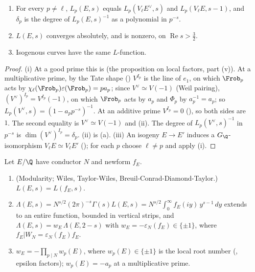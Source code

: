 \begin{proposition}\label{prop:lfunctions:LE}
\begin{enumerate}[label=(\roman*)]
\item For every $p\ne\ell$, $L_p(E,s)$ equals $L_p(V_\ell E^\vee,s)$ and $L_p(V_\ell E,s-1)$, and $\delta_p$ is the degree of $L_p(E,s)^{-1}$ as a polynomial in $p^{-s}$.
\item $L(E,s)$ converges absolutely, and is nonzero, on $\operatorname{Re}s>\frac32$.
\item Isogenous curves have the same $L$-function.
\end{enumerate}
\end{proposition}

\begin{proof}
(i) At a good prime this is  (the proposition on local factors, part (v)). At a multiplicative prime, by the Tate shape () $V^{I_p}$ is the
line of $e_1$, on which $\Frob_p$ acts by $\chi_\ell(\Frob_p)\varepsilon(\Frob_p)=pa_p$; since $V^\vee\simeq V(-1)$ (Weil pairing), $(V^\vee)^{I_p}=V^{I_p}(-1)$, on which $\Frob_p$ acts by $a_p$
and $\Phi_p$ by $a_p^{-1}=a_p$; so $L_p(V^\vee,s)=(1-a_pp^{-s})^{-1}$. At an additive prime $V^{I_p}=0$ (), so both sides are $1$. The second equality is
$V^\vee\simeq V(-1)$ and (ii). The degree of $L_p(V^\vee,s)^{-1}$ in $p^{-s}$ is $\dim(V^\vee)^{I_p}=\delta_p$. (ii) is
(a). (iii) An isogeny $E\to E'$ induces a $G_\Q$-isomorphism $V_\ell E\simeq V_\ell E'$ (); for each $p$ choose $\ell\ne p$ and apply (i).
\end{proof}

\begin{theorem}\label{thm:lfunctions:LE-feq}
Let $E/\Q$ have conductor $N$ and newform $f_E$.
\begin{enumerate}[label=(\roman*)]
\item (Modularity; Wiles, Taylor-Wiles, Breuil-Conrad-Diamond-Taylor.) $L(E,s)=L(f_E,s)$.
\item $\Lambda(E,s)=N^{s/2}(2\pi)^{-s}\Gamma(s)L(E,s)=N^{s/2}\int_0^\infty f_E(iy)\,y^{s-1}\,dy$ extends to an entire function, bounded in vertical strips, and
$\Lambda(E,s)=w_E\,\Lambda(E,2-s)$ with $w_E=-\varepsilon_N(f_E)\in\{\pm1\}$, where $f_E|W_N=\varepsilon_N(f_E)f_E$.
\item $w_E=-\prod_{p\mid N}w_p(E)$, where $w_p(E)\in\{\pm1\}$ is the local root number (, epsilon factors); $w_p(E)=-a_p$ at a multiplicative prime.
\end{enumerate}
\end{theorem}

